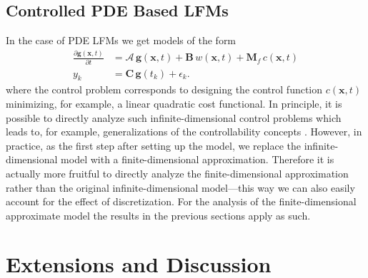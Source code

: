 \documentclass[journal]{IEEEtran}
\newcommand{\simo}[1]{{\color{red}#1}}
\begin{document}
\subsection{Controlled PDE Based LFMs}
%
In the case of PDE LFMs we get models of the form
%
\begin{equation}
\begin{split}
  \frac{\partial \mathbf{g}(\mathbf{x},t)}{\partial t}
  &= \mathbf{\mathcal{A}} \, \mathbf{g}(\mathbf{x},t)
  + \mathbf{B} \, w(\mathbf{x},t) + \mathbf{M}_f \, c(\mathbf{x},t) \\
  y_k &= \mathbf{C} \, \mathbf{g}(t_k) + \epsilon_k.
\end{split}
\end{equation}
%
where the control problem corresponds to designing the control function $c(\mathbf{x},t)$ minimizing, for example, a linear quadratic cost functional. In principle, it is possible to directly analyze such infinite-dimensional control problems which leads to, for example, generalizations of the controllability concepts \cite{Curtain:2012}. However, in practice, as the first step after setting up the model, we replace the infinite-dimensional model with a finite-dimensional approximation. Therefore it is actually more fruitful to directly analyze the finite-dimensional approximation rather than the original infinite-dimensional model---this way we can also easily account for the effect of discretization. For the analysis of the finite-dimensional approximate model the results in the previous sections apply as such.


\section{Extensions and Discussion}

%
%
%
\end{document}
